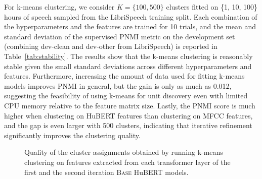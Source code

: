 For k-means clustering, we consider $K=\{100,500\}$ clusters fitted on \{1, 10, 100\} hours of speech sampled from the LibriSpeech training split. Each combination of the hyperparameters and the features are trained for 10 trials, and the mean and standard deviation of the supervised PNMI metric on the development set (combining dev-clean and dev-other from LibriSpeech) is reported in Table~\ref{tab:stability}.
The results show that the k-means clustering is reasonably stable given the small standard deviations across different hyperparameters and features. Furthermore, increasing the amount of data used for fitting k-means models improves PNMI in general, but the gain is only as much as 0.012, suggesting the feasibility of using k-means for unit discovery even with limited CPU memory relative to the feature matrix size. Lastly, the PNMI score is much higher when clustering on HuBERT features than clustering on MFCC features, and the gap is even larger with 500 clusters, indicating that iterative refinement significantly improves the clustering quality.



\begin{table}[t]
    \begin{minipage}[c]{0.68\textwidth}
        \centering
        
        \caption{The effect of the training objective and clustering quality on performance. $C$ refers to the number of units, and $\alpha$ is the weight for masked frames.}
        \label{tab:loss}
    \end{minipage}
    \hspace{.5cm}
    \begin{minipage}[c]{0.28\textwidth}
        \centering
        
        \caption{Cluster ensembles with k-means and product k-means.}
        \label{tab:ens}
    \end{minipage}
\end{table}

\begin{figure}[h]
  \centering
  \begin{subfigure}[b]{\linewidth}
    \centering
    
  \end{subfigure}
  \begin{subfigure}[b]{\linewidth}
    \centering
    
  \end{subfigure}
  \begin{subfigure}[b]{\linewidth}
    \centering
    
  \end{subfigure}
  \caption{Quality of the cluster assignments obtained by running k-means clustering on features extracted from each transformer layer of the first and the second iteration \textsc{Base} HuBERT models.}
  \label{fig:qual_layer}
\end{figure}


